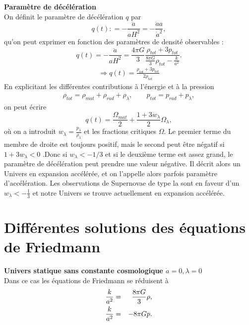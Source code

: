 \documentclass[a4paper,12pt]{report}
\theoremstyle{plain}
\theoremstyle{plain}
\begin{document}
\textbf{Param\`etre de d\'ec\'el\'eration } \\
On d\'efinit le param\`etre de d\'ec\'el\'eration $q$ par 
\begin{equation}
q\left(t \right) : = -\frac{\ddot{a}}{aH^2}=-\frac{\ddot{a}a}{\dot{a}^2},
\end{equation}
qu'on peut exprimer en fonction des param\`etres de densit\'e observables :
\begin{equation}
q\left(t \right) =-\frac{\ddot{a}}{aH^2}=\frac{4\pi G}{3} \frac{\rho _{tot} + 3 p_{tot}}{\frac{8 \pi G}{3} \rho_{tot} - \frac{k}{a^2}}.
\end{equation}
\begin{eqnarray}
\Rightarrow q\left(t \right) = \frac{\rho_{tot}+3p_{tot}}{2\rho_{tot}} 
\end{eqnarray}
En explicitant les diff\'erentes contributions \`a l'\'energie et \`a la pression \\
\begin{eqnarray}
\rho_{tot}=\rho_{mat}+\rho_{rad}+\rho_\lambda , \qquad p_{tot} =p_{rad}+p_{\lambda} ,
\end{eqnarray}
on peut \'ecrire
\begin{equation}
q\left(t \right)=\frac{\Omega_{mat}}{2} + \frac{1+3w_\lambda}{2} \Omega_\lambda ,
\end{equation}
o\`{u} on a introduit $w_\lambda=\frac{p_\lambda}{\rho_\lambda }$ et les fractions critiques $\Omega$. Le premier terme du membre de droite est toujours positif, mais le second peut \^etre n\'egatif si $ 1+3 w_\lambda < 0$ .Donc si $w_\lambda<-1/3$ et si le deuxi\`eme terme est assez grand, le param\`etre  de d\'ec\'el\'eration peut prendre une valeur n\'egative. Il d\'ecrit alors un Univers en expansion acc\'el\'er\'ee, et on l'appelle alors parfois param\`etre d'acc\'el\'eration. Les observations de Supernovae de type la sont en faveur d'un $w_\lambda < - \frac{1}{3}$ et notre Univers se trouve actuellement en expansion acc\'el\'er\'ee.
\section{Diff\'erentes solutions des \'equations de Friedmann}

\textbf{Univers statique sans constante cosmologique $ \dot{a}=0, \lambda =0$} \\

Dans ce cas les \'equations de Friedmann se r\'eduisent \`a 
\begin{eqnarray}
 \frac{k}{a^2} & =& \frac{8\pi G}{3} \rho ,  \cr
 \frac{k}{a^2}&=& - 8 \pi G p.
\end{eqnarray}
\end{document}
